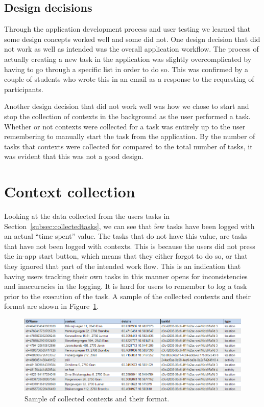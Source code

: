\subsection{Design decisions}
Through the application development process and user testing we learned that some design concepts worked well and some did not. One design decision that did not work as well as intended was the overall application workflow. The process of actually creating a new task in the application was slightly overcomplicated by having to go through a specific list in order to do so. This was confirmed by a couple of students who wrote this in an email as a response to the requesting of participants.

Another design decision that did not work well was how we chose to start and stop the collection of contexts in the background as the user performed a task. Whether or not contexts were collected for a task was entirely up to the user remembering to manually start the task from the application. By the number of tasks that contexts were collected for compared to the total number of tasks, it was evident that this was not a good design.



\section{Context collection}
\label{sec:contextcollection}

Looking at the data collected from the users tasks in Section~\ref{subsec:collectedtasks}, we can see that few tasks have been logged with an actual ``time spent'' value. The tasks that do not have this value, are tasks that have not been logged with contexts. This is because the users did not press the in-app start button, which means that they either forgot to do so, or that they ignored that part of the intended work flow. This is an indication that having users tracking their own tasks in this manner opens for inconsistencies and inaccuracies in the logging. It is hard for users to remember to log a task prior to the execution of the task. A sample of the collected contexts and their format are shown in Figure~\ref{fig:collectedcontextssample}.
\begin{figure}[tbp]
\centering
\includegraphics[width=\columnwidth]{figures/CollectedContextsFormat.PNG}
\caption[Collected contexts sample]{Sample of collected contexts and their format.}
\label{fig:collectedcontextssample}
\end{figure}


